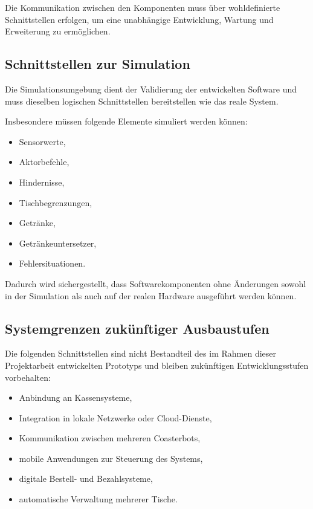 \documentclass[
  a4paper,
  12pt,
  DIV=12,        %
  parskip=half,  %
  headings=small %
]{scrartcl}
\theoremstyle{definition}
\providecommand{\tightlist}{%
  \setlength{\itemsep}{0pt}\setlength{\parskip}{0pt}}
\theoremstyle{definition}
\begin{document}
Die Kommunikation zwischen den Komponenten muss über wohldefinierte
Schnittstellen erfolgen, um eine unabhängige Entwicklung, Wartung und
Erweiterung zu ermöglichen.

\subsection{Schnittstellen zur
Simulation}\label{schnittstellen-zur-simulation}

Die Simulationsumgebung dient der Validierung der entwickelten Software
und muss dieselben logischen Schnittstellen bereitstellen wie das reale
System.

Insbesondere müssen folgende Elemente simuliert werden können:

\begin{itemize}
\tightlist
\item
  Sensorwerte,
\item
  Aktorbefehle,
\item
  Hindernisse,
\item
  Tischbegrenzungen,
\item
  Getränke,
\item
  Getränkeuntersetzer,
\item
  Fehlersituationen.
\end{itemize}

Dadurch wird sichergestellt, dass Softwarekomponenten ohne Änderungen
sowohl in der Simulation als auch auf der realen Hardware ausgeführt
werden können.

\subsection{Systemgrenzen zukünftiger
Ausbaustufen}\label{systemgrenzen-zukuxfcnftiger-ausbaustufen}

Die folgenden Schnittstellen sind nicht Bestandteil des im Rahmen dieser
Projektarbeit entwickelten Prototyps und bleiben zukünftigen
Entwicklungsstufen vorbehalten:

\begin{itemize}
\tightlist
\item
  Anbindung an Kassensysteme,
\item
  Integration in lokale Netzwerke oder Cloud-Dienste,
\item
  Kommunikation zwischen mehreren Coasterbots,
\item
  mobile Anwendungen zur Steuerung des Systems,
\item
  digitale Bestell- und Bezahlsysteme,
\item
  automatische Verwaltung mehrerer Tische.
\end{itemize}
\end{document}
